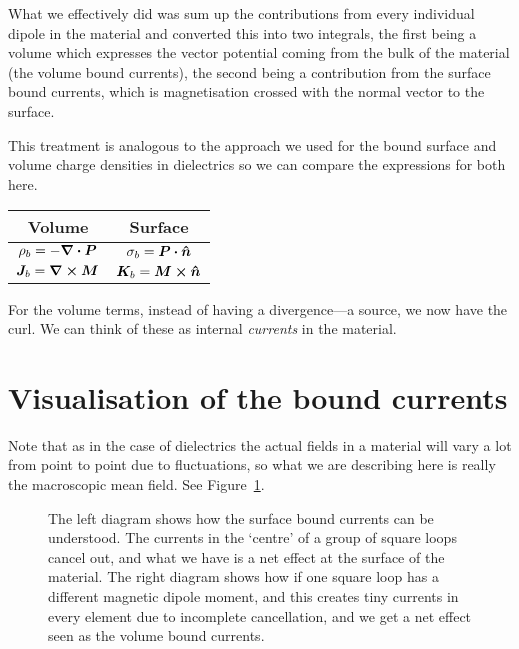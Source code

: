 \documentclass[12pt,chapterprefix=false,dvipsnames]{scrbook}
\theoremstyle{dotless}
\theoremstyle{definition}
\begin{document}
What we effectively did was sum up the contributions from every
individual dipole in the material and converted this into two
integrals, the first being a volume which expresses the vector
potential coming from the bulk of the material (the volume bound
currents), the second being a contribution from the surface
bound currents, which is magnetisation crossed with the normal
vector to the surface.

This treatment is analogous to the approach we used for the
bound surface and volume charge densities in dielectrics so we
can compare the expressions for both here.

\begin{center}
	\begin{tabular}{c  c}
		\textbf{Volume}                 & \textbf{Surface}                     \\
		\toprule
		$\rho_b = -\divergence{\bm{P}}$ & $\sigma_b = \bm{P}\vdot\bm{\hat{n}}$ \\
		$\bm{J}_b = \curl{\bm{M}}$      & $\bm{K}_b =
		\bm{M}\cross\bm{\hat{n}}$                                              \\
	\end{tabular}
\end{center}

For the volume terms, instead of having a divergence---a source,
we now have the curl. We can think of these as internal
\textit{currents} in the material.

\section{Visualisation of the bound currents}%
\label{sec:visualisation_of_the_bound_currents}

Note that as in the case of dielectrics the actual fields in a
material will vary a lot from point to point due to
fluctuations, so what we are describing here is really the
macroscopic mean field. See Figure~\ref{fig:visualising_magnetic_surface_volume_bound_currents}.

\begin{figure}[htpb]
	\centering
	
	\caption{The left diagram shows how the surface bound currents can be
		understood. The currents in the `centre' of a group of square
		loops cancel out, and what we have is a net effect at the surface of the material.
		The right diagram shows how if one square loop has a different
		magnetic dipole moment, and this creates tiny currents in every element due to
		incomplete cancellation, and we get a net effect seen as the volume bound currents.}%
	\label{fig:visualising_magnetic_surface_volume_bound_currents}
\end{figure}
\end{document}
